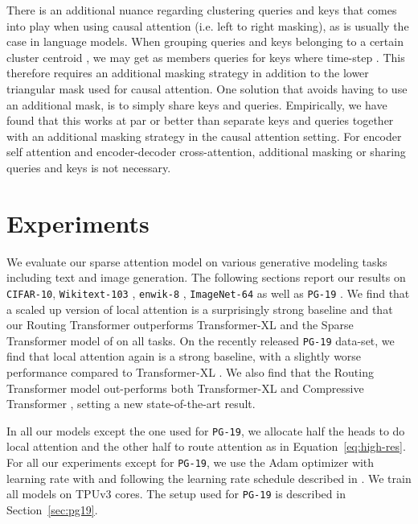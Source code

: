 \documentclass[a4paper]{article}
\begin{document}
There is an additional nuance regarding clustering queries and keys that comes into play
when using causal attention (i.e. left to right masking), as is usually the case in language 
models. When grouping queries and keys belonging to a certain cluster centroid , we 
may get as members queries  for keys  where time-step . This therefore requires an additional masking strategy in addition to the lower triangular mask 
used for causal attention. One solution that avoids
having to use an additional mask, is to simply share keys and queries. Empirically, we have found that
this works at par or better than separate keys and queries together with an additional masking strategy
in the causal attention setting. For encoder self attention and encoder-decoder cross-attention, additional masking
or sharing queries and keys is not necessary.

\section{Experiments}\label{sec:experiments}
We evaluate our sparse attention model on various generative modeling tasks
including text and image generation. 
The following sections report our
results on \texttt{CIFAR-10}, \texttt{Wikitext-103} \citep{merity2016pointer},
\texttt{enwik-8} \citep{mahoney2011large}, \texttt{ImageNet-64} 
as well as \texttt{PG-19} \cite{rae2020compressive}. 
We find that a scaled up version of local attention is a surprisingly strong baseline
and that our Routing Transformer outperforms Transformer-XL 
\citep{dai2019transformer} and the Sparse Transformer model of
\citet{child2019generating} on all tasks. 
On the recently released \texttt{PG-19} data-set, 
we find that local attention again is a strong baseline,
with a slightly worse performance compared to Transformer-XL \citep{dai2019transformer}.
We also find that the Routing Transformer model out-performs both Transformer-XL 
\citep{dai2019transformer} and Compressive Transformer \citep{rae2020compressive}, setting a 
new state-of-the-art result. 

In all our models except the one used for \texttt{PG-19}, we allocate
half the heads to do local attention and the other half
to route attention as in Equation~\ref{eq:high-res}.
For all our experiments except for \texttt{PG-19},
we use the Adam optimizer \citep{adam} with learning rate  with
 and  following the learning
rate schedule described in \citet{vaswani2017attention}. We train all models on  TPUv3 cores.
The setup used for \texttt{PG-19} is described in Section~\ref{sec:pg19}.
\end{document}
